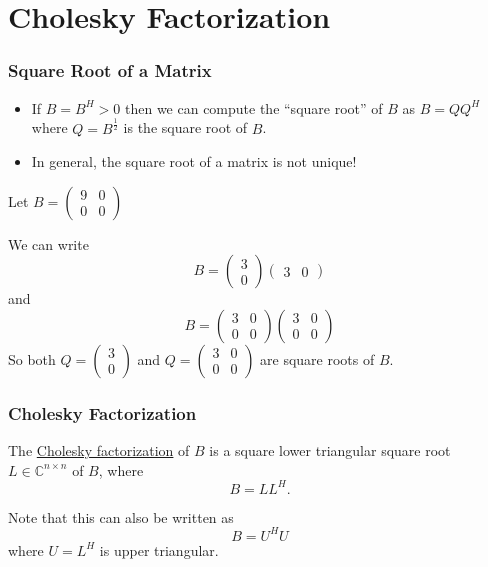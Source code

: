 \documentclass{beamer}
\begin{document}
\section{Cholesky Factorization}
\frame{\sectionpage}

\begin{frame}\frametitle{Square Root of a Matrix}
	\begin{itemize}
		\item If $B = B^H > 0$ then we can compute the ``square root'' of $B$ as $B = QQ^H$ where $Q = B^{\frac{1}{2}}$ is the square root of $B$.
		\item In general, the square root of a matrix is not unique!
	\end{itemize}
	\begin{example}
		Let $B = 
		\begin{pmatrix}
			9 & 0\\
			0 & 0
		\end{pmatrix}$
	
	
		We can write
		\[ 
			B = \begin{pmatrix} 3 \\ 0 \end{pmatrix}\begin{pmatrix} 3 & 0 \end{pmatrix} 
		\]
		and
		\[ 
			B = \begin{pmatrix}
					3 & 0\\
					0 & 0
				\end{pmatrix}
				\begin{pmatrix}
					3 & 0\\
					0 & 0
				\end{pmatrix}
		\]
		So both $Q = \begin{pmatrix} 3 \\ 0 \end{pmatrix}$ and $Q = \begin{pmatrix}
			3 & 0\\
			0 & 0
		\end{pmatrix}$ are square roots of $B$.
	\end{example}
\end{frame}

\begin{frame}\frametitle{Cholesky Factorization}

	\begin{definition}
	The \underline{Cholesky factorization} of $B$ is a square lower triangular square root $L \in \mathbb{C}^{n \times n}$ of $B$, where 
	\[ B = LL^H. \] 
	\end{definition}

	\vfill
	
	Note that this can also be written as
	\[ B=U^HU \]
	where $U=L^H$ is upper triangular.
\end{frame}
\end{document}
